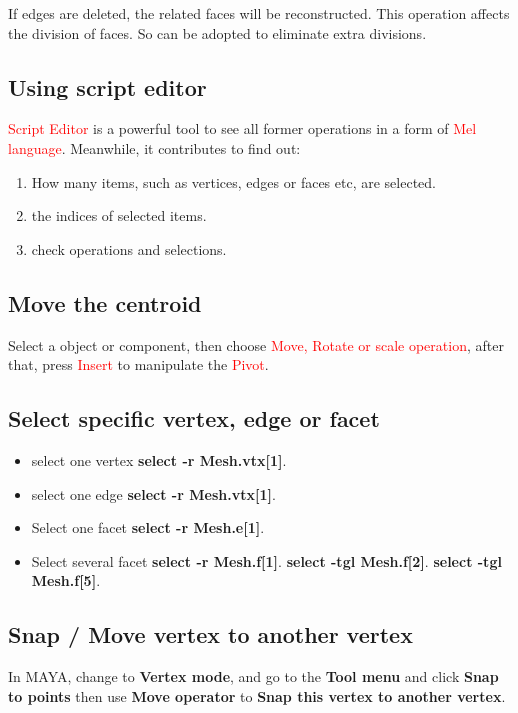 If edges are deleted, the related faces will be reconstructed. This operation affects the division of faces. So can be adopted to eliminate extra divisions.

\subsection{Using script editor}
\textcolor{red}{Script Editor} is a powerful tool to see all former operations in a form of \textcolor{red}{Mel language}. Meanwhile, it contributes to find out:\\
\begin{enumerate}
	\item How many items, such as vertices, edges or faces etc, are selected.
	\item the indices of selected items.
	\item check operations and selections.
\end{enumerate}

\subsection{Move the centroid}
Select a object or component, then choose \textcolor{red}{Move, Rotate or scale operation}, after that, press \textcolor{red}{Insert} to manipulate the \textcolor{red}{Pivot}.

\subsection{Select specific vertex, edge or facet}
\begin{itemize}
	\item select one vertex
	\textbf{select -r Mesh.vtx[1]}.
	\item select one edge
	\textbf{select -r Mesh.vtx[1]}.
	\item Select one facet
	\textbf{select -r Mesh.e[1]}.
	\item Select several facet
	\textbf{select -r Mesh.f[1]}.
	\textbf{select -tgl Mesh.f[2]}.
	\textbf{select -tgl Mesh.f[5]}.
\end{itemize}

\subsection{Snap / Move vertex to another vertex}
In MAYA, change to \textbf{Vertex mode}, and go to the \textbf{Tool menu} and click \textbf{Snap to points} then use \textbf{Move operator} to \textbf{Snap this vertex to another vertex}.


